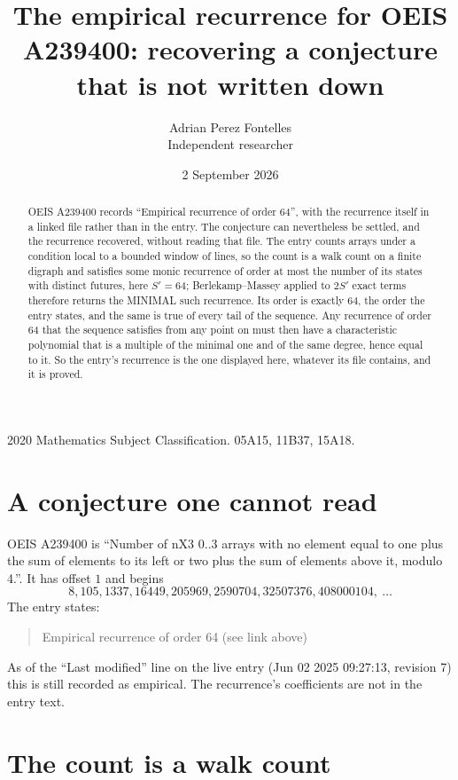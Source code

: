 \documentclass[11pt,a4paper]{article}
\title{The empirical recurrence for OEIS A239400: recovering a conjecture that is not written down}
\author{Adrian Perez Fontelles\\ \small Independent researcher}
\date{2 September 2026}
\theoremstyle{plain}
\theoremstyle{definition}
\begin{document}
\maketitle

\begin{abstract}
OEIS A239400 records ``Empirical recurrence of order $64$'', with the recurrence itself in a
linked file rather than in the entry. The conjecture can nevertheless be settled, and the
recurrence recovered, without reading that file. The entry counts arrays under a condition
local to a bounded window of lines, so the count is a walk count on a finite digraph and
satisfies some monic recurrence of order at most the number of its states with distinct
futures, here $S'=64$; Berlekamp--Massey applied to $2S'$ exact
terms therefore returns the MINIMAL such recurrence. Its order is exactly $64$, the order
the entry states, and the same is true of every tail of the sequence. Any recurrence of order
$64$ that the sequence satisfies from any point on must then have a characteristic
polynomial that is a multiple of the minimal one and of the same degree, hence equal to it. So
the entry's recurrence is the one displayed here, whatever its file contains, and it is
proved.
\end{abstract}

\noindent\small 2020 Mathematics Subject Classification. 05A15, 11B37, 15A18.\normalsize

\section{A conjecture one cannot read}

OEIS A239400 is ``Number of nX3 0..3 arrays with no element equal to one plus the sum of elements to its left or two plus the sum of elements above it, modulo 4.''. It has offset $1$ and begins
\[
8, 105, 1337, 16449, 205969, 2590704, 32507376, 408000104,\ \dots
\]
The entry states:
\begin{quote}
Empirical recurrence of order 64 (see link above)
\end{quote}
As of the ``Last modified'' line on the live entry (Jun 02 2025 09:27:13, revision 7) this is still
recorded as empirical. The recurrence's coefficients are not in the entry text.

\section{The count is a walk count}
\end{document}
